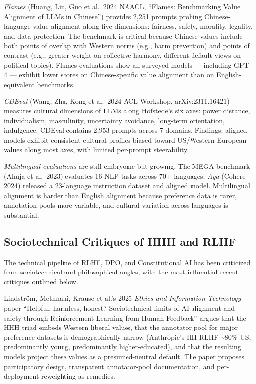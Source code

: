 \documentclass{article}
\begin{document}
\emph{Flames} (Huang, Liu, Guo et al.~2024 NAACL, ``Flames: Benchmarking Value Alignment of LLMs in Chinese'') provides 2,251 prompts probing Chinese-language value alignment along five dimensions: fairness, safety, morality, legality, and data protection. The benchmark is critical because Chinese values include both points of overlap with Western norms (e.g., harm prevention) and points of contrast (e.g., greater weight on collective harmony, different default views on political topics). Flames evaluations show all surveyed models --- including GPT-4 --- exhibit lower scores on Chinese-specific value alignment than on English-equivalent benchmarks.

\emph{CDEval} (Wang, Zhu, Kong et al.~2024 ACL Workshop, arXiv:2311.16421) measures cultural dimensions of LLMs along Hofstede's six axes: power distance, individualism, masculinity, uncertainty avoidance, long-term orientation, indulgence. CDEval contains 2,953 prompts across 7 domains. Findings: aligned models exhibit consistent cultural profiles biased toward US/Western European values along most axes, with limited per-prompt steerability.

\emph{Multilingual evaluations} are still embryonic but growing. The MEGA benchmark (Ahuja et al.~2023) evaluates 16 NLP tasks across 70+ languages; \emph{Aya} (Cohere 2024) released a 23-language instruction dataset and aligned model. Multilingual alignment is harder than English alignment because preference data is rarer, annotation pools more variable, and cultural variation across languages is substantial.

\subsection{Sociotechnical Critiques of HHH and RLHF}\label{sociotechnical-critiques-of-hhh-and-rlhf}

The technical pipeline of RLHF, DPO, and Constitutional AI has been criticized from sociotechnical and philosophical angles, with the most influential recent critiques outlined below.

Lindström, Methnani, Krause et al.'s 2025 \emph{Ethics and Information Technology} paper ``Helpful, harmless, honest? Sociotechnical limits of AI alignment and safety through Reinforcement Learning from Human Feedback'' argues that the HHH triad embeds Western liberal values, that the annotator pool for major preference datasets is demographically narrow (Anthropic's HH-RLHF \textasciitilde80\% US, predominantly young, predominantly higher-educated), and that the resulting models project these values as a presumed-neutral default. The paper proposes participatory design, transparent annotator-pool documentation, and per-deployment reweighting as remedies.
\end{document}
